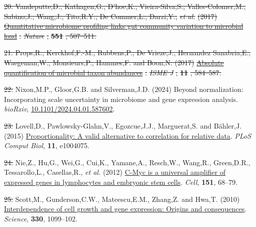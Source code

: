 \documentclass[
]{article}
\newlength{\cslhangindent}
\newenvironment{CSLReferences}[2] %
 {\begin{list}{}{%
  \setlength{\itemindent}{0pt}
  \setlength{\leftmargin}{0pt}
  \setlength{\parsep}{0pt}
  \ifodd #1
   \setlength{\leftmargin}{\cslhangindent}
   \setlength{\itemindent}{-1\cslhangindent}
  \fi
  \setlength{\itemsep}{#2\baselineskip}}}
 {\end{list}}
\providecommand{\DIFadd}[1]{{\protect\color{blue}\uwave{#1}}} %
\providecommand{\DIFdel}[1]{{\protect\color{red}\sout{#1}}}                      %
\providecommand{\DIFaddbegin}{} %
\providecommand{\DIFaddend}{} %
\providecommand{\DIFdelbegin}{} %
\providecommand{\DIFdelend}{} %
\newcommand{\DIFscaledelfig}{0.5}
\newlength{\DIFdelgraphicswidth} %
\newlength{\DIFdelgraphicsheight} %
\newcommand{\DIFaddincludegraphics}[2][]{{\color{blue}\fbox{\DIFOincludegraphics[#1]{#2}}}} %
\newcommand{\DIFdelincludegraphics}[2][]{%
\sbox{\DIFdelgraphicsbox}{\DIFOincludegraphics[#1]{#2}}%
\settoboxwidth{\DIFdelgraphicswidth}{\DIFdelgraphicsbox} %
\settoboxtotalheight{\DIFdelgraphicsheight}{\DIFdelgraphicsbox} %
\scalebox{\DIFscaledelfig}{%
\parbox[b]{\DIFdelgraphicswidth}{\usebox{\DIFdelgraphicsbox}\\[-\baselineskip] \rule{\DIFdelgraphicswidth}{0em}}\llap{\resizebox{\DIFdelgraphicswidth}{\DIFdelgraphicsheight}{%
\setlength{\unitlength}{\DIFdelgraphicswidth}%
\begin{picture}(1,1)%
\thicklines\linethickness{2pt} %
{\color[rgb]{1,0,0}\put(0,0){\framebox(1,1){}}}%
{\color[rgb]{1,0,0}\put(0,0){\line( 1,1){1}}}%
{\color[rgb]{1,0,0}\put(0,1){\line(1,-1){1}}}%
\end{picture}%
}\hspace*{3pt}}} %
} %
\DeclareRobustCommand{\DIFaddbegin}{\DIFOaddbegin \let\includegraphics\DIFaddincludegraphics} %
\DeclareRobustCommand{\DIFaddend}{\DIFOaddend \let\includegraphics\DIFOincludegraphics} %
\DeclareRobustCommand{\DIFdelbegin}{\DIFOdelbegin \let\includegraphics\DIFdelincludegraphics} %
\DeclareRobustCommand{\DIFdelend}{\DIFOaddend \let\includegraphics\DIFOincludegraphics} %
\begin{document}
\begin{CSLReferences}{1}{1}
\DIFdel{20. Vandeputte,D., Kathagen,G., D'hoe,K., Vieira-Silva,S.,
Valles-Colomer,M., Sabino,J., Wang,J., Tito,R.Y., De Commer,L.,
Darzi,Y., }\emph{\DIFdel{et al.}} %
\DIFdel{(2017)
}\href{https://doi.org/10.1038/nature24460}{\DIFdel{Quantitative microbiome
profiling links gut community variation to microbial load}}%
\DIFdel{.
}\emph{\DIFdel{Nature}}%
\DIFdel{, }\textbf{\DIFdel{551}}%
\DIFdel{, 507--511.
}%

\DIFdel{21. Props,R., Kerckhof,F.-M., Rubbens,P., De Vrieze,J., Hernandez
Sanabria,E., Waegeman,W., Monsieurs,P., Hammes,F. and Boon,N. (2017)
}\href{https://doi.org/10.1038/ismej.2016.117}{\DIFdel{Absolute quantification of
microbial taxon abundances}}%
\DIFdel{. }\emph{\DIFdel{ISME J}}%
\DIFdel{, }\textbf{\DIFdel{11}}%
\DIFdel{, 584--587.
}%

\DIFdelend {}
\DIFdelbegin \DIFdel{22. }\DIFdelend \DIFaddbegin \DIFadd{20. }\DIFaddend Nixon,M.P., Gloor,G.B. and Silverman,J.D. (2024) Beyond
normalization: Incorporating scale uncertainty in microbiome and gene
expression analysis. \emph{bioRxiv},
\href{https://doi.org/10.1101/2024.04.01.587602}{10.1101/2024.04.01.587602}.

\DIFdelbegin \DIFdel{23. }\DIFdelend \DIFaddbegin \DIFadd{21. }\DIFaddend Lovell,D., Pawlowsky-Glahn,V., Egozcue,J.J., Marguerat,S. and
Bähler,J. (2015)
\href{https://doi.org/10.1371/journal.pcbi.1004075}{Proportionality: A
valid alternative to correlation for relative data}. \emph{PLoS Comput
Biol}, \textbf{11}, e1004075.

\DIFdelbegin \DIFdel{24. }\DIFdelend \DIFaddbegin \DIFadd{22. }\DIFaddend Nie,Z., Hu,G., Wei,G., Cui,K., Yamane,A., Resch,W., Wang,R.,
Green,D.R., Tessarollo,L., Casellas,R., \emph{et al.} (2012)
\href{https://doi.org/10.1016/j.cell.2012.08.033}{C-{M}yc is a universal
amplifier of expressed genes in lymphocytes and embryonic stem cells}.
\emph{Cell}, \textbf{151}, 68--79.

\DIFdelbegin \DIFdel{25. }\DIFdelend \DIFaddbegin \DIFadd{23. }\DIFaddend Scott,M., Gunderson,C.W., Mateescu,E.M., Zhang,Z. and Hwa,T. (2010)
\href{https://doi.org/10.1126/science.1192588}{Interdependence of cell
growth and gene expression: Origins and consequences}. \emph{Science},
\textbf{330}, 1099--102.


\end{CSLReferences}
\end{document}
